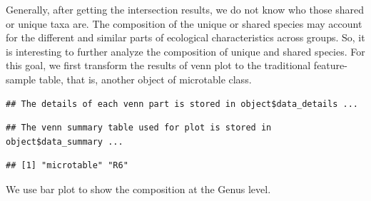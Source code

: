 \documentclass[
]{book}
\newenvironment{Shaded}{\begin{snugshade}}{\end{snugshade}}
\newcommand{\AttributeTok}[1]{\textcolor[rgb]{0.77,0.63,0.00}{#1}}
\newcommand{\CommentTok}[1]{\textcolor[rgb]{0.56,0.35,0.01}{\textit{#1}}}
\newcommand{\ConstantTok}[1]{\textcolor[rgb]{0.00,0.00,0.00}{#1}}
\newcommand{\FunctionTok}[1]{\textcolor[rgb]{0.00,0.00,0.00}{#1}}
\newcommand{\NormalTok}[1]{#1}
\newcommand{\OtherTok}[1]{\textcolor[rgb]{0.56,0.35,0.01}{#1}}
\newcommand{\SpecialCharTok}[1]{\textcolor[rgb]{0.00,0.00,0.00}{#1}}
\newcommand{\StringTok}[1]{\textcolor[rgb]{0.31,0.60,0.02}{#1}}
\begin{document}
Generally, after getting the intersection results, we do not know who those shared or unique taxa are.
The composition of the unique or shared species may account for the different and similar parts of ecological characteristics across groups\citep{Mendes_Deciphering_2011}.
So, it is interesting to further analyze the composition of unique and shared species.
For this goal, we first transform the results of venn plot to the traditional feature-sample table, that is, another object of microtable class.

\begin{Shaded}
\end{Shaded}

\begin{verbatim}
## The details of each venn part is stored in object$data_details ...
\end{verbatim}

\begin{verbatim}
## The venn summary table used for plot is stored in object$data_summary ...
\end{verbatim}

\begin{Shaded}
\end{Shaded}

\begin{verbatim}
## [1] "microtable" "R6"
\end{verbatim}

We use bar plot to show the composition at the Genus level.
\end{document}
